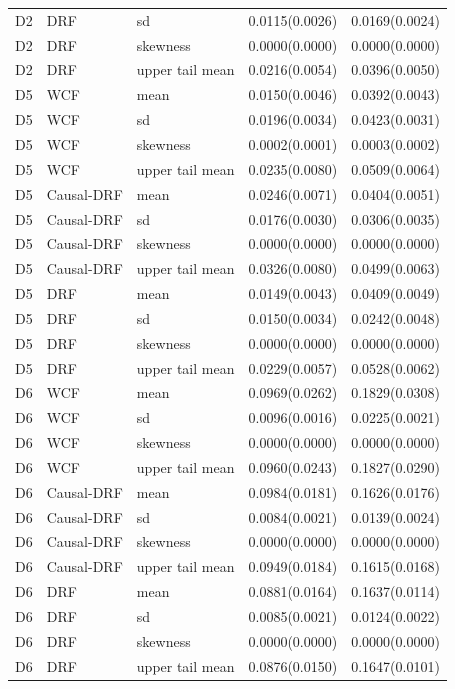 \begin{longtable}{lllrr}
D2 & DRF & sd & 0.0115(0.0026) & 0.0169(0.0024) \\
D2 & DRF & skewness & 0.0000(0.0000) & 0.0000(0.0000) \\
D2 & DRF & upper tail mean & 0.0216(0.0054) & 0.0396(0.0050) \\
D5 & WCF & mean & 0.0150(0.0046) & 0.0392(0.0043) \\
D5 & WCF & sd & 0.0196(0.0034) & 0.0423(0.0031) \\
D5 & WCF & skewness & 0.0002(0.0001) & 0.0003(0.0002) \\
D5 & WCF & upper tail mean & 0.0235(0.0080) & 0.0509(0.0064) \\
D5 & Causal-DRF & mean & 0.0246(0.0071) & 0.0404(0.0051) \\
D5 & Causal-DRF & sd & 0.0176(0.0030) & 0.0306(0.0035) \\
D5 & Causal-DRF & skewness & 0.0000(0.0000) & 0.0000(0.0000) \\
D5 & Causal-DRF & upper tail mean & 0.0326(0.0080) & 0.0499(0.0063) \\
D5 & DRF & mean & 0.0149(0.0043) & 0.0409(0.0049) \\
D5 & DRF & sd & 0.0150(0.0034) & 0.0242(0.0048) \\
D5 & DRF & skewness & 0.0000(0.0000) & 0.0000(0.0000) \\
D5 & DRF & upper tail mean & 0.0229(0.0057) & 0.0528(0.0062) \\
D6 & WCF & mean & 0.0969(0.0262) & 0.1829(0.0308) \\
D6 & WCF & sd & 0.0096(0.0016) & 0.0225(0.0021) \\
D6 & WCF & skewness & 0.0000(0.0000) & 0.0000(0.0000) \\
D6 & WCF & upper tail mean & 0.0960(0.0243) & 0.1827(0.0290) \\
D6 & Causal-DRF & mean & 0.0984(0.0181) & 0.1626(0.0176) \\
D6 & Causal-DRF & sd & 0.0084(0.0021) & 0.0139(0.0024) \\
D6 & Causal-DRF & skewness & 0.0000(0.0000) & 0.0000(0.0000) \\
D6 & Causal-DRF & upper tail mean & 0.0949(0.0184) & 0.1615(0.0168) \\
D6 & DRF & mean & 0.0881(0.0164) & 0.1637(0.0114) \\
D6 & DRF & sd & 0.0085(0.0021) & 0.0124(0.0022) \\
D6 & DRF & skewness & 0.0000(0.0000) & 0.0000(0.0000) \\
D6 & DRF & upper tail mean & 0.0876(0.0150) & 0.1647(0.0101) \\

\end{longtable}
